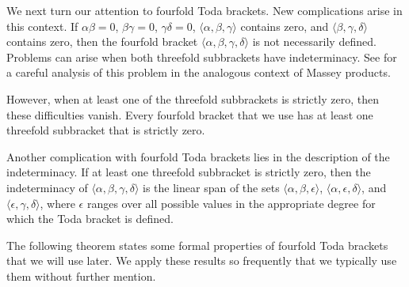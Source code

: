 


We next turn our attention to fourfold Toda brackets.  New complications
arise in this context.  If $\alpha \beta = 0$, $\beta \gamma = 0$,
$\gamma \delta = 0$, $\langle \alpha, \beta, \gamma \rangle$
contains zero, and $\langle \beta, \gamma, \delta \rangle$
contains zero, then the fourfold bracket
$\langle \alpha, \beta, \gamma, \delta \rangle$
is not necessarily defined.  Problems can arise when both
threefold subbrackets have indeterminacy.
See \cite{Isaksen14b} for a careful analysis of this problem in the
analogous context of Massey products.

However, when at least one of the threefold subbrackets is strictly
zero, then these difficulties vanish.  Every fourfold bracket that
we use has at least one threefold subbracket that is strictly zero.

Another complication with fourfold Toda brackets lies in the
description of the indeterminacy.  If at least one
threefold subbracket is strictly zero, then the indeterminacy of
$\langle \alpha, \beta, \gamma, \delta \rangle$
is the linear span of the sets
$\langle \alpha, \beta, \epsilon \rangle$,
$\langle \alpha, \epsilon, \delta \rangle$,
and $\langle \epsilon, \gamma, \delta \rangle$,
where $\epsilon$ ranges over all possible values in the appropriate
degree for which the Toda bracket is defined.

The following theorem states some formal properties of fourfold
Toda brackets that we will use later.  
We apply these results so frequently that
we typically use them without further mention.

